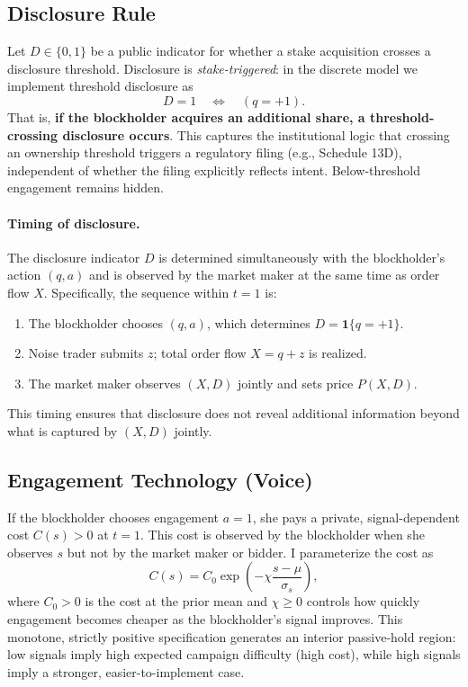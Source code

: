 \documentclass[11pt]{article}
\newcommand{\1}{\mathbf{1}}
\begin{document}
\subsection{Disclosure Rule}

Let $D \in \{0, 1\}$ be a public indicator for whether a stake acquisition crosses a disclosure threshold. Disclosure is \emph{stake-triggered}: in the discrete model we implement threshold disclosure as
\[
D = 1 \quad \Longleftrightarrow \quad (q = +1).
\]
That is, \textbf{if the blockholder acquires an additional share, a threshold-crossing disclosure occurs}. This captures the institutional logic that crossing an ownership threshold triggers a regulatory filing (e.g., Schedule 13D), independent of whether the filing explicitly reflects intent. Below-threshold engagement remains hidden.

\paragraph{Timing of disclosure.} The disclosure indicator $D$ is determined simultaneously with the blockholder's action $(q, a)$ and is observed by the market maker at the same time as order flow $X$. Specifically, the sequence within $t=1$ is:
\begin{enumerate}[label=(\roman*),leftmargin=2em,itemsep=0pt]
\item The blockholder chooses $(q, a)$, which determines $D = \1\{q=+1\}$.
\item Noise trader submits $z$; total order flow $X = q + z$ is realized.
\item The market maker observes $(X, D)$ jointly and sets price $P(X, D)$.
\end{enumerate}
This timing ensures that disclosure does not reveal additional information beyond what is captured by $(X, D)$ jointly.

\subsection{Engagement Technology (Voice)}
\label{sec:engagement}

If the blockholder chooses engagement $a = 1$, she pays a private, signal-dependent cost $C(s) > 0$ at $t = 1$. This cost is observed by the blockholder when she observes $s$ but not by the market maker or bidder. I parameterize the cost as
\[
C(s) = C_0 \exp\!\left(-\chi \frac{s - \mu}{\sigma_s}\right),
\]
where $C_0 > 0$ is the cost at the prior mean and $\chi \geq 0$ controls how quickly engagement becomes cheaper as the blockholder's signal improves. This monotone, strictly positive specification generates an interior passive-hold region: low signals imply high expected campaign difficulty (high cost), while high signals imply a stronger, easier-to-implement case.
\end{document}
